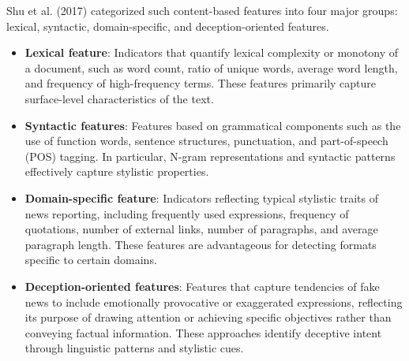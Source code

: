 \documentclass[a4paper,fleqn]{cas-sc}
\begin{document}
Shu et al. (2017) categorized such content-based features into four major groups: lexical, syntactic, domain-specific, and deception-oriented features.

\begin{itemize}
    \item{\textbf{%
    Lexical feature}:
    Indicators that quantify lexical complexity or monotony of a document, such as word count, ratio of unique words, average word length, and frequency of high-frequency terms. These features primarily capture surface-level characteristics of the text.}

    \item{\textbf{%
    Syntactic features}:
    Features based on grammatical components such as the use of function words, sentence structures, punctuation, and part-of-speech (POS) tagging. In particular, N-gram representations and syntactic patterns effectively capture stylistic properties.}
    
    \item{\textbf{%
    Domain-specific feature}:
    Indicators reflecting typical stylistic traits of news reporting, including frequently used expressions, frequency of quotations, number of external links, number of paragraphs, and average paragraph length. These features are advantageous for detecting formats specific to certain domains.}
    \item{\textbf{%
    Deception-oriented features}:
    Features that capture tendencies of fake news to include emotionally provocative or exaggerated expressions, reflecting its purpose of drawing attention or achieving specific objectives rather than conveying factual information. These approaches identify deceptive intent through linguistic patterns and stylistic cues.}
\end{itemize}
  
\end{document}
